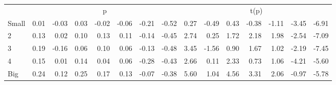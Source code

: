 \begin{table}[!ht]
\begin{tabular}{lrrrrrrrrrrrrrr}
  
     & \multicolumn{7}{c}{p} & \multicolumn{7}{c}{t(p)}   \\
     \cmidrule(r){2-8} \cmidrule(r){9-15} 
    Small  & 0.01  & -0.03  & 0.03  & -0.02  & -0.06  & -0.21  & -0.52  & 0.27  & -0.49  & 0.43  & -0.38  & -1.11  & -3.45  & -6.91   \\
    2  & 0.13  & 0.02  & 0.10  & 0.13  & 0.11  & -0.14  & -0.45  & 2.74  & 0.25  & 1.72  & 2.18  & 1.98  & -2.54  & -7.09   \\
    3  & 0.19  & -0.16  & 0.06  & 0.10  & 0.06  & -0.13  & -0.48  & 3.45  & -1.56  & 0.90  & 1.67  & 1.02  & -2.19  & -7.45   \\
    4  & 0.15  & 0.01  & 0.14  & 0.04  & 0.06  & -0.28  & -0.43  & 2.66  & 0.11  & 2.33  & 0.73  & 1.06  & -4.21  & -5.60   \\
    Big  & 0.24  & 0.12  & 0.25  & 0.17  & 0.13  & -0.07  & -0.38  & 5.60  & 1.04  & 4.56  & 3.31  & 2.06  & -0.97  & -5.78   \\
    
  
  \bottomrule
\end{tabular}
\label{tbl:25_Size_NI_B16}
\end{table}